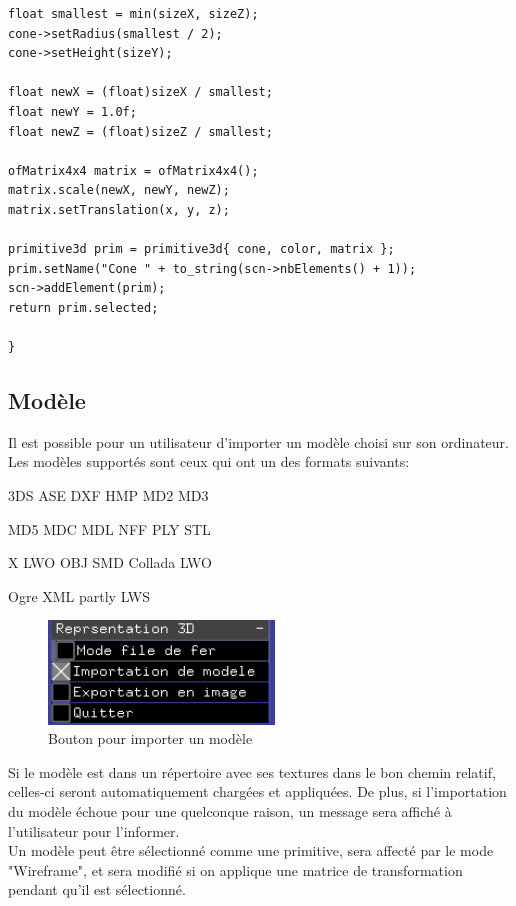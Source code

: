 \begin{lstlisting}
float smallest = min(sizeX, sizeZ);
cone->setRadius(smallest / 2);
cone->setHeight(sizeY);

float newX = (float)sizeX / smallest;
float newY = 1.0f;
float newZ = (float)sizeZ / smallest;

ofMatrix4x4 matrix = ofMatrix4x4();
matrix.scale(newX, newY, newZ);
matrix.setTranslation(x, y, z);

primitive3d prim = primitive3d{ cone, color, matrix };
prim.setName("Cone " + to_string(scn->nbElements() + 1));
scn->addElement(prim);
return prim.selected;

}
\end{lstlisting}

\subsection{Modèle}

Il est possible pour un utilisateur d'importer un modèle choisi sur son ordinateur. Les modèles supportés sont ceux qui ont un des formats suivants:

\begin{list}{}{}
	\item 3DS \tab ASE \tab DXF \tab HMP \tab MD2 \tab MD3
	\item MD5 \tab MDC \tab MDL \tab NFF \tab PLY \tab STL 
	\item X \tab LWO \tab OBJ \tab SMD \tab Collada \tab LWO
	\item Ogre XML \tab partly LWS
\end{list}

\begin{figure}[h]
	\centering
	\includegraphics[width=6cm]{fig/importerModele.png}
	\caption{Bouton pour importer un modèle}
	\label{fig:importModel}
\end{figure}

Si le modèle est dans un répertoire avec ses textures dans le bon chemin relatif, celles-ci seront automatiquement chargées et appliquées. De plus, si l'importation du modèle échoue pour une quelconque raison, un message sera affiché à l'utilisateur pour l'informer.\\

Un modèle peut être sélectionné comme une primitive, sera affecté par le mode "Wireframe", et sera modifié si on applique une matrice de transformation pendant qu'il est sélectionné.

